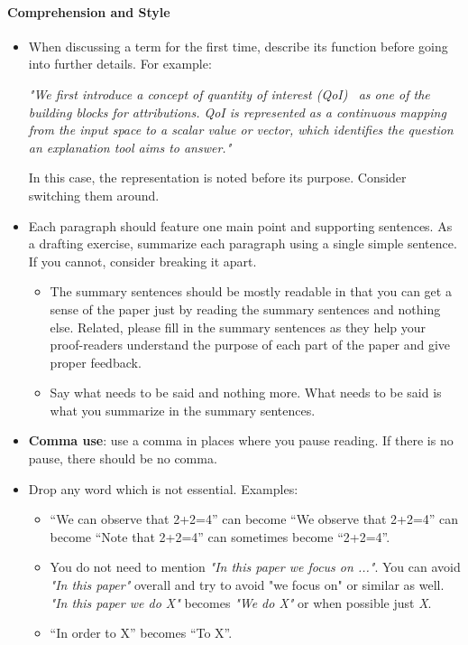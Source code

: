 \paragraph{Comprehension and Style}
\begin{itemize}
\item{} When discussing a term for the first time, describe its function before going into further
  details. For example:

  \textit{"We first introduce a concept of \textit{quantity of interest}
    (QoI)~\cite{leino2018influence} as one of the building blocks for attributions. QoI is
    represented as a continuous mapping from the input space to a scalar value or vector, which
    identifies the question an explanation tool aims to answer."}

  In this case, the representation is noted before its purpose. Consider switching them around.

\item{} Each paragraph should feature one main point and supporting sentences. As a drafting
  exercise, summarize each paragraph using a single simple sentence. If you cannot, consider
  breaking it apart.

  \begin{itemize}
    \item{} The summary sentences should be mostly readable in that you can get a sense of the
      paper just by reading the summary sentences and nothing else. Related, please fill in the
      summary sentences as they help your proof-readers understand the purpose of each part of the
      paper and give proper feedback.
    \item{} Say what needs to be said and nothing more. What needs to be said is what you summarize
      in the summary sentences.
  \end{itemize}

\item{} \textbf{Comma use}: use a comma in places where you pause reading. If there is no pause,
  there should be no comma.

\item{} Drop any word which is not essential. Examples:
  \begin{itemize}
  \item{} ``We can observe that 2+2=4'' can become ``We observe that 2+2=4'' can become ``Note that
    2+2=4'' can sometimes become ``2+2=4''.
  \item{} You do not need to mention \textit{"In this paper we focus on ..."}. You can avoid
    \textit{"In this paper"} overall and try to avoid "we focus on" or similar as well. \textit{"In
      this paper we do X"} becomes \textit{"We do X"} or when possible just \textit{X}.
  \item{} ``In order to X'' becomes ``To X''.
  \end{itemize}
\end{itemize}

